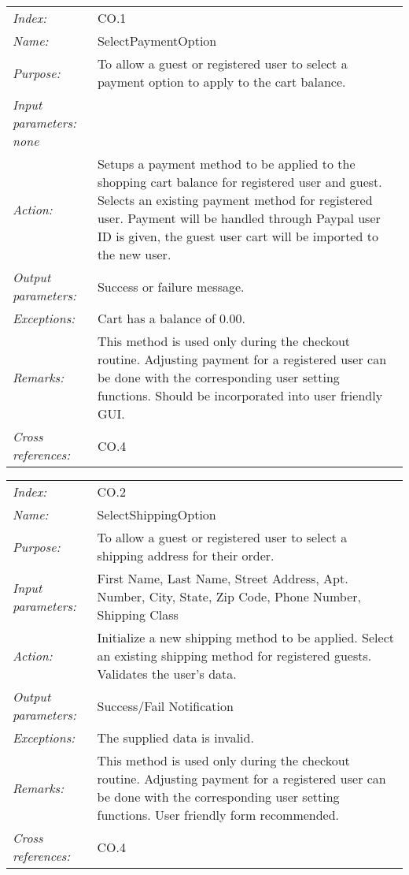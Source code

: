 \documentclass[10pt,letter]{article}
\begin{document}
\begin{tabularx}{\textwidth}{l X}
    \it{Index:} & CO.1 \\
    \it{Name:} & SelectPaymentOption \\
    \it{Purpose:} & To allow a guest or registered user to select a payment option to apply to the cart balance. \\
    \it{Input parameters:} none \\
    \it{Action:} & Setups a payment method to be applied to the shopping cart balance for registered user and guest. Selects an existing payment method for registered user. Payment will be handled through Paypal
    user ID is given, the guest user cart will be imported to the new user.\\
    \it{Output parameters:} & Success or failure message. \\
    \it{Exceptions:} &  Cart has a balance of $0.00$. \\
    \it{Remarks:} & This method is used only during the checkout routine. Adjusting payment for a registered user can be done with the corresponding user setting functions. Should be incorporated into user friendly GUI.\\
    \it{Cross references:} & CO.4 \\
    \hline
\end{tabularx}

\begin{tabularx}{\textwidth}{l X}
    \it{Index:} & CO.2 \\
    \it{Name:} & SelectShippingOption \\
    \it{Purpose:} & To allow a guest or registered user to select a shipping address for their order.\\
    \it{Input parameters:} & First Name, Last Name, Street Address, Apt. Number, City, State, Zip Code, Phone Number, Shipping Class \\
    \it{Action:} & Initialize a new shipping method to be applied. Select an existing shipping method for registered guests. Validates the user's data.\\
    \it{Output parameters:} & Success/Fail Notification  \\
    \it{Exceptions:} & The supplied data is invalid. \\
    \it{Remarks:} & This method is used only during the checkout routine. Adjusting payment for a registered user can be done with the corresponding user setting functions. User friendly form recommended. \\
    \it{Cross references:} & CO.4\\
    \hline
\end{tabularx}
\end{document}
